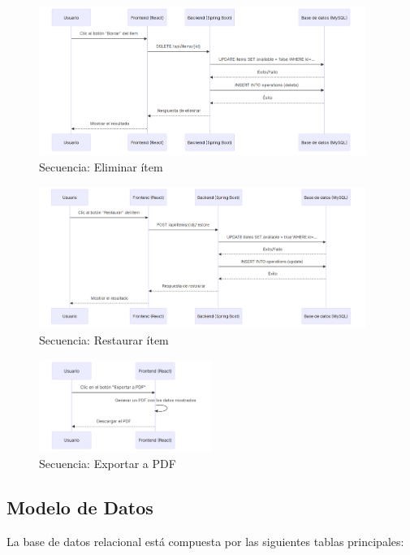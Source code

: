 \begin{figure}[H]
    \centering
    \includegraphics[width=0.95\textwidth]{diagrams/sequence/delete}
    \caption{Secuencia: Eliminar ítem}
\end{figure}

\begin{figure}[H]
    \centering
    \includegraphics[width=0.95\textwidth]{diagrams/sequence/restore}
    \caption{Secuencia: Restaurar ítem}
\end{figure}

\begin{figure}[H]
    \centering
    \includegraphics[width=0.5\textwidth]{diagrams/sequence/export}
    \caption{Secuencia: Exportar a PDF}
\end{figure}

\subsection{Modelo de Datos}

La base de datos relacional está compuesta por las siguientes tablas principales:

